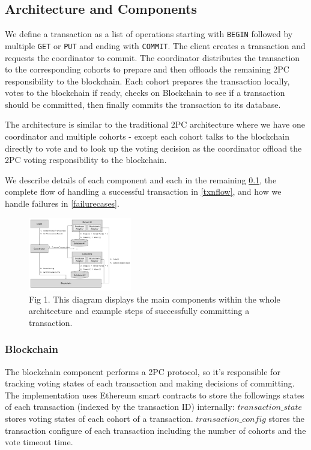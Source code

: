 \documentclass[11pt,conference]{IEEEtran}
\begin{document}
\subsection{Architecture and Components} \label{components}
We define a transaction as a list of operations starting with \texttt{BEGIN} followed by multiple \texttt{GET} or \texttt{PUT} and ending with \texttt{COMMIT}. The client creates a transaction and requests the coordinator to commit. The coordinator distributes the transaction to the corresponding cohorts to prepare and then offloads the remaining 2PC responsibility to the blockchain. Each cohort prepares the transaction locally, votes to the blockchain if ready, checks on Blockchain to see if a transaction should be committed, then finally commits the transaction to its database.

The architecture is similar to the traditional 2PC architecture where we have one coordinator and multiple cohorts - except each cohort talks to the blockchain directly to vote and to look up the voting decision as the coordinator offload the 2PC voting responsibility to the blockchain.

We describe details of each component and each in the remaining \ref{components}, the complete flow of handling a successful transaction in \ref{txnflow}, and how we handle failures in \ref{failurecases}.
\begin{figure}[h]
\centering
\includegraphics[width=0.4\textwidth]{./diagram.png}
\caption{Fig 1. This diagram displays the main components within the whole architecture and example steps of successfully committing a transaction.}
\label{fig:Panel}
\end{figure}

\subsubsection{Blockchain} \label{blockchain}
The blockchain component performs a 2PC protocol, so it’s responsible for tracking voting states of each transaction and making decisions of committing. The implementation uses Ethereum smart contracts to store the followings states of each transaction (indexed by the transaction ID) internally:
$transaction\_state$ stores voting states of each cohort of a transaction.
$transaction\_config$ stores the transaction configure of each transaction including the number of cohorts and the vote timeout time.
\end{document}
